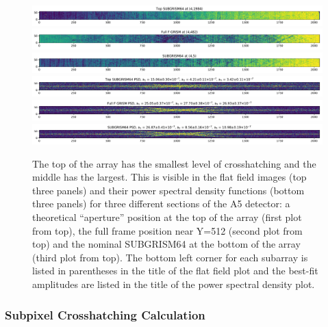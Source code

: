 \documentclass{aastex62}
\begin{document}
\begin{figure}[!hbtp]
\centering
\includegraphics[width=0.99\columnwidth]{subg_pos_topGrism64.pdf}\\
\includegraphics[width=0.99\columnwidth]{subg_pos_fullfGrismRegion.pdf}\\
\includegraphics[width=0.99\columnwidth]{subg_pos_subgrism64.pdf}\\
\vspace{0.2in}
\includegraphics[width=0.99\columnwidth]{subg_pos_topGrism64_psd.pdf}\\
\includegraphics[width=0.99\columnwidth]{subg_pos_fullfGrismRegion_psd.pdf}\\
\includegraphics[width=0.99\columnwidth]{subg_pos_subgrism64_psd.pdf}\\
\caption{
The top of the array has the smallest level of crosshatching and the middle has the largest.
This is visible in the flat field images (top three panels) and their power spectral density functions (bottom three panels) for three different sections of the A5 detector: a theoretical ``aperture'' position at the top of the array (first plot from top), the full frame position near Y=512 (second plot from top) and the nominal SUBGRISM64 at the bottom of the array (third plot from top).
The bottom left corner for each subarray is listed in parentheses in the title of the flat field plot and the best-fit amplitudes are listed in the title of the power spectral density plot.
 }\label{fig:subpixScanSimulation}
\end{figure}

\subsubsection{Subpixel Crosshatching Calculation}\label{sec:CrosshatchSim}
\end{document}
